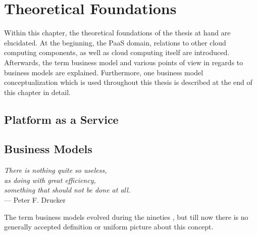 \chapter{Theoretical Foundations}\label{ch:tf}

Within this chapter, the theoretical foundations of the thesis at hand are elucidated. At the beginning, the \ac{PaaS} domain, relations to other cloud computing components, as well as cloud computing itself are introduced. Afterwards, the term business model and various points of view in regards to business models are explained. Furthermore, one business model conceptualization which is used throughout this thesis is described at the end of this chapter in detail. 

	\section{Platform as a Service}\label{ch:tf:paas}

	\section{Business Models}\label{ch:tf:bm}
	
	\begin{flushright}{\slshape    
    There is nothing quite so useless,\\
		as doing with great efficiency, \\
		something that should not be done at all.} \\ \medskip
    --- Peter F. Drucker
	\end{flushright}

	
	
	The term business models evolved during the nineties , but till now there is no generally accepted definition or uniform picture about this concept.
	
